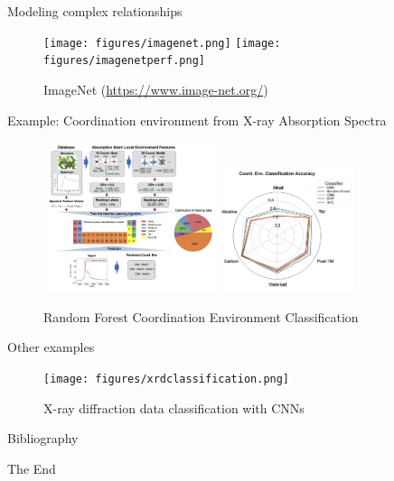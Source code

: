 \documentclass[aspectratio=169]{beamer}
\begin{document}
    \begin{frame}{Modeling complex relationships}
        \begin{figure}
            \centering
            \texttt{[image: figures/imagenet.png]}
            \texttt{[image: figures/imagenetperf.png]}
            \caption{ImageNet (\url{https://www.image-net.org/})}
        \end{figure}
    \end{frame}


    \begin{frame}{Example: Coordination environment from X-ray Absorption Spectra}
        \begin{figure}
            \centering
            \includegraphics[width=0.45\textwidth]{figures/xasflowchart.png}
            \includegraphics[width=0.35\textwidth]{figures/xasaccuracy.png}
            \caption{Random Forest Coordination Environment Classification\cite{zhengRandomForestModels2020}}
        \end{figure}
    \end{frame}


    \begin{frame}{Other examples}
        \begin{figure}
            \centering
            \texttt{[image: figures/xrdclassification.png]}
            \caption{X-ray diffraction data classification with CNNs\cite{oviedoFastInterpretableClassification2019}}
        \end{figure}
    \end{frame}

    \begin{frame}[allowframebreaks]{Bibliography}
        
        
    \end{frame}


    \begin{frame}
        \Huge{\centerline{The End}}
    \end{frame}
\end{document}
